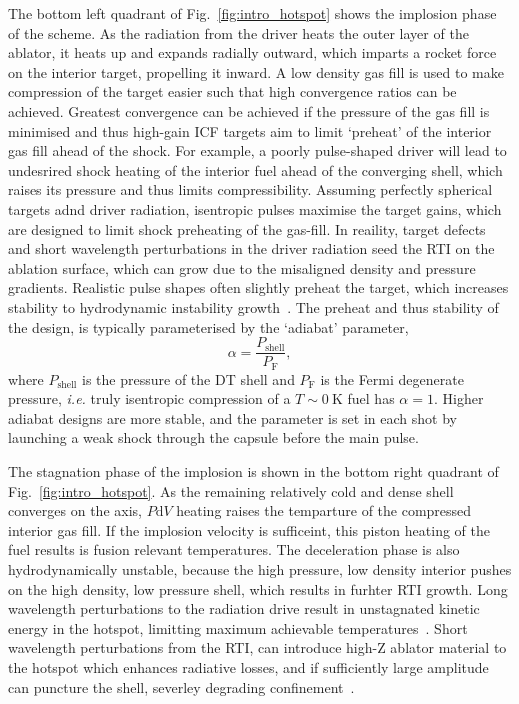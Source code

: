 The bottom left quadrant of Fig.~\ref{fig:intro_hotspot} shows the implosion phase of the scheme.
As the radiation from the driver heats the outer layer of the ablator, it heats up and expands radially outward, which imparts a rocket force on the interior target, propelling it inward.
A low density gas fill is used to make compression of the target easier such that high convergence ratios can be achieved.
Greatest convergence can be achieved if the pressure of the gas fill is minimised and thus high-gain \ac{ICF} targets aim to limit `preheat' of the interior gas fill ahead of the shock.
For example, a poorly pulse-shaped driver will lead to undesrired shock heating of the interior fuel ahead of the converging shell, which raises its pressure and thus limits compressibility.
Assuming perfectly spherical targets adnd driver radiation, isentropic pulses maximise the target gains, which are designed to limit shock preheating of the gas-fill.
In reaility, target defects and short wavelength perturbations in the driver radiation seed the \ac{RTI} on the ablation surface, which can grow due to the misaligned density and pressure gradients.
Realistic pulse shapes often slightly preheat the target, which increases stability to hydrodynamic instability growth~\cite{goncharov_improved_2003,hurricane_high-foot_2014}.
The preheat and thus stability of the design, is typically parameterised by the `adiabat' parameter,
\begin{equation}
    \label{eq:intro_adiabat}
    \alpha = \frac{P_{\text{shell}}}{P_{\text{F}}},
\end{equation}
where $P_{\text{shell}}$ is the pressure of the DT shell and $P_{\text{F}}$ is the Fermi degenerate pressure, \textit{i.e.} truly isentropic compression of a $T\sim0\ \text{K}$ fuel has $\alpha=1$.
Higher adiabat designs are more stable, and the parameter is set in each shot by launching a weak shock through the capsule before the main pulse.

The stagnation phase of the implosion is shown in the bottom right quadrant of Fig.~\ref{fig:intro_hotspot}.
As the remaining relatively cold and dense shell converges on the axis, $P\text{d}V$ heating raises the temparture of the compressed interior gas fill.
If the implosion velocity is sufficeint, this piston heating of the fuel results is fusion relevant temperatures.
The deceleration phase is also hydrodynamically unstable, because the high pressure, low density interior pushes on the high density, low pressure shell, which results in furhter \ac{RTI} growth.
Long wavelength perturbations to the radiation drive result in unstagnated kinetic energy in the hotspot, limitting maximum achievable temperatures~\cite{gatu_johnson_impact_2018}.
Short wavelength perturbations from the \ac{RTI}, can introduce high-Z ablator material to the hotspot which enhances radiative losses, and if sufficiently large amplitude can puncture the shell, severley degrading confinement~\cite{smalyuk_review_2020}.

